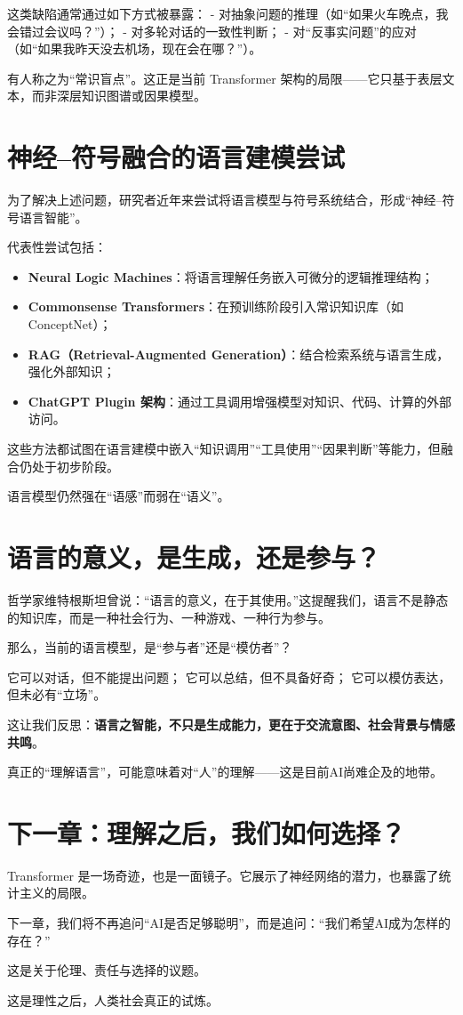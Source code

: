 这类缺陷通常通过如下方式被暴露：
- 对抽象问题的推理（如“如果火车晚点，我会错过会议吗？”）；
- 对多轮对话的一致性判断；
- 对“反事实问题”的应对（如“如果我昨天没去机场，现在会在哪？”）。

有人称之为“常识盲点”。这正是当前 Transformer 架构的局限——它只基于表层文本，而非深层知识图谱或因果模型。

\section*{神经–符号融合的语言建模尝试}

为了解决上述问题，研究者近年来尝试将语言模型与符号系统结合，形成“神经–符号语言智能”。

代表性尝试包括：

\begin{itemize}
\item \textbf{Neural Logic Machines}：将语言理解任务嵌入可微分的逻辑推理结构；
\item \textbf{Commonsense Transformers}：在预训练阶段引入常识知识库（如 ConceptNet）；
\item \textbf{RAG（Retrieval-Augmented Generation）}：结合检索系统与语言生成，强化外部知识；
\item \textbf{ChatGPT Plugin 架构}：通过工具调用增强模型对知识、代码、计算的外部访问。
\end{itemize}

这些方法都试图在语言建模中嵌入“知识调用”“工具使用”“因果判断”等能力，但融合仍处于初步阶段。

语言模型仍然强在“语感”而弱在“语义”。

\section*{语言的意义，是生成，还是参与？}

哲学家维特根斯坦曾说：“语言的意义，在于其使用。”这提醒我们，语言不是静态的知识库，而是一种社会行为、一种游戏、一种行为参与。

那么，当前的语言模型，是“参与者”还是“模仿者”？

它可以对话，但不能提出问题；
它可以总结，但不具备好奇；
它可以模仿表达，但未必有“立场”。

这让我们反思：\textbf{语言之智能，不只是生成能力，更在于交流意图、社会背景与情感共鸣}。

真正的“理解语言”，可能意味着对“人”的理解——这是目前AI尚难企及的地带。

\section*{下一章：理解之后，我们如何选择？}

Transformer 是一场奇迹，也是一面镜子。它展示了神经网络的潜力，也暴露了统计主义的局限。

下一章，我们将不再追问“AI是否足够聪明”，而是追问：“我们希望AI成为怎样的存在？”

这是关于伦理、责任与选择的议题。

这是理性之后，人类社会真正的试炼。

\nocite{*}
\printbibliography[heading=bibintoc, title=\ebibname]


\newpage


